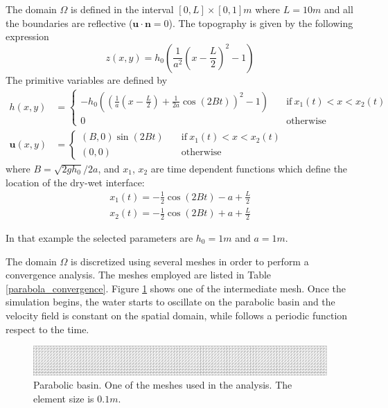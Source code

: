 \documentclass[a4paper,12pt]{elsarticle}
\begin{document}
The domain $\Omega$ is defined in the interval $[0,L]\times[0,1]m$ where $L=10m$ and all the boundaries are reflective ($\mathbf{u}\cdot\mathbf{n} = 0$). The topography is given by the following expression
\begin{equation}
z(x,y) = h_0 \left(\frac{1}{a^2}\left(x - \frac{L}{2}\right)^2 - 1\right)
\end{equation}
The primitive variables are defined by
\begin{subequations}
\begin{align}
h(x,y) &=
\begin{cases}
-h_0\left(\left(\frac{1}{a}\left(x - \frac{L}{2}\right) + \frac{1}{2a}\cos(2Bt)\right)^2 - 1\right)
\quad &\text{if} \ x_1(t) < x < x_2(t) \\
0 \quad &\text{otherwise}
\end{cases} \\
\mathbf{u}(x,y) &=
\begin{cases}
(B,0)\sin(2Bt) \quad &\text{if} \ x_1(t) < x < x_2(t) \\
(0,0) \quad &\text{otherwise}
\end{cases}
\end{align}
\end{subequations}
where $B=\sqrt{2gh_0}/2a$, and $x_1$, $x_2$ are time dependent functions which define the location of the dry-wet interface:
\begin{equation}
\begin{split}
x_1(t) = -\frac{1}{2}\cos(2Bt) - a + \frac{L}{2} \\
x_2(t) = -\frac{1}{2}\cos(2Bt) + a + \frac{L}{2}
\end{split}
\end{equation}

In that example the selected parameters are $h_0=1m$ and $a=1m$.

The domain $\Omega$ is discretized using several meshes in order to perform a convergence analysis. The meshes employed are listed in Table \ref{parabola_convergence}. Figure \ref{parabola_mesh} shows one of the intermediate mesh. Once the simulation begins, the water starts to oscillate on the parabolic basin and the velocity field is constant on the spatial domain, while follows a periodic function respect to the time.

\begin{figure}
    \includegraphics[width=\textwidth]{img/par/mesh_0.1.pdf}
    \caption{Parabolic basin. One of the meshes used in the analysis. The element size is $0.1m$.}
    \label{parabola_mesh}
\end{figure}
\end{document}
